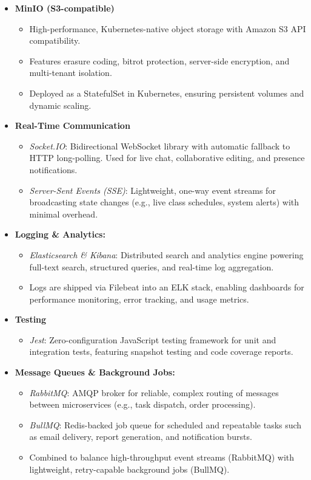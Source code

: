 \begin{itemize}
  \item \textbf{MinIO (S3-compatible)}  
    \begin{itemize}
      \item High-performance, Kubernetes-native object storage with Amazon S3 API compatibility.  
      \item Features erasure coding, bitrot protection, server-side encryption, and multi-tenant isolation.  
      \item Deployed as a StatefulSet in Kubernetes, ensuring persistent volumes and dynamic scaling.
    \end{itemize}

  \item \textbf{Real-Time Communication}  
    \begin{itemize}
      \item \emph{Socket.IO}: Bidirectional WebSocket library with automatic fallback to HTTP long-polling. Used for live chat, collaborative editing, and presence notifications.  
      \item \emph{Server-Sent Events (SSE)}: Lightweight, one-way event streams for broadcasting state changes (e.g., live class schedules, system alerts) with minimal overhead.
    \end{itemize}

  \item \textbf{Logging \& Analytics:}  
    \begin{itemize}
      \item \emph{Elasticsearch \& Kibana}: Distributed search and analytics engine powering full-text search, structured queries, and real-time log aggregation.  
      \item Logs are shipped via Filebeat into an ELK stack, enabling dashboards for performance monitoring, error tracking, and usage metrics.
    \end{itemize}

  \item \textbf{Testing}  
    \begin{itemize}
      \item \emph{Jest}: Zero-configuration JavaScript testing framework for unit and integration tests, featuring snapshot testing and code coverage reports.  
    \end{itemize}

  \item \textbf{Message Queues \& Background Jobs:}  
    \begin{itemize}
      \item \emph{RabbitMQ}: AMQP broker for reliable, complex routing of messages between microservices (e.g., task dispatch, order processing).  
      \item \emph{BullMQ}: Redis-backed job queue for scheduled and repeatable tasks such as email delivery, report generation, and notification bursts.  
      \item Combined to balance high-throughput event streams (RabbitMQ) with lightweight, retry-capable background jobs (BullMQ).
    \end{itemize}
\end{itemize}

